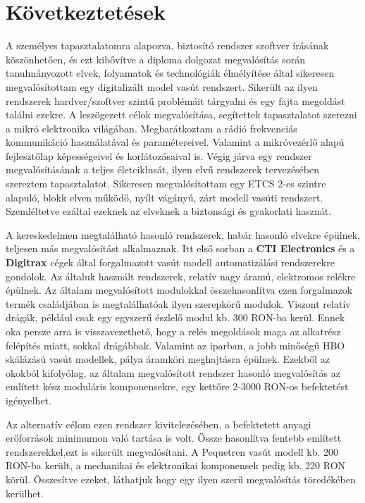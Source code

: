 \documentclass[a4paper,12pt]{article}
\begin{document}
\section{Következtetések}
A személyes tapasztalatomra alapozva, biztosító rendszer szoftver írásának köszönhetően, és ezt kibővítve a diploma dolgozat megvalósítás során tanulmányozott elvek, folyamatok és technológiák élmélyítése által sikeresen megvalósítottam egy digitalizált model vasút rendszert.
Sikerült az ilyen rendszerek hardver/szoftver szintű problémáit tárgyalni és egy fajta megoldást találni ezekre.
A leszögezett célok megvalósítása, segítettek tapasztalatot szerezni a mikró elektronika világában.
Megbarátkoztam a rádió frekvenciás kommunikáció használatával és paramétereivel.
Valamint a mikróvezérlő alapú fejlesztőlap képességeivel és korlátozásaival is.
Végig járva egy rendszer megvalósításának a teljes életciklusát, ilyen elvű rendszerek tervezésében szereztem tapasztalatot.
Sikeresen megvalósítottam egy ETCS 2-es szintre alapuló, blokk elven működő, nyílt vágányú, zárt modell vasúti rendszert.
Szemléltetve ezáltal ezeknek az elveknek a biztonsági és gyakorlati hasznát.

A kereskedelmen megtalálható hasonló rendszerek, habár hasonló elvekre épülnek, teljesen más megvalósítást alkalmaznak.
Itt első sorban a \textbf{CTI Electronics} és a \textbf{Digitrax} cégek által forgalmazott vasút modell automatizálási rendszerekre gondolok.
Az általuk használt rendszerek, relatív nagy áramú, elektromos relékre épülnek. 
Az általam megvalósított modulokkal összehasonlítva ezen forgalmazok termék családjában is megtalálhatóak ilyen szerepkörű modulok.
Viszont relatív drágák, például csak egy egyszerű észlelő modul kb. 300 RON-ba kerül.
Ennek oka persze arra is visszavezethető, hogy a relés megoldások maga az alkatrész felépítés miatt, sokkal drágábbak.
Valamint az iparban, a jobb minőségű HBO skálázású vasút modellek, pálya áramköri meghajtásra épülnek.
Ezekből az okokból kifolyólag, az általam megvalósított rendszer hasonló megvalósítás az említett kész moduláris komponensekre, egy kettőre 2-3000 RON-os befektetést igényelhet.

Az alternatív célom ezen rendszer kivitelezésében, a befektetett anyagi erőforrások minimumon való tartása is volt. Össze hasonlítva fentebb említett rendszerekkel,ezt is sikerült megvalósítani.
A Pequetren vasút modell kb. 200 RON-ba került, a mechanikai és elektronikai komponensek pedig kb. 220 RON körül. 
Összesítve ezeket, láthatjuk hogy egy ilyen szerű megvalósítás töredékében kerülhet.
\end{document}
